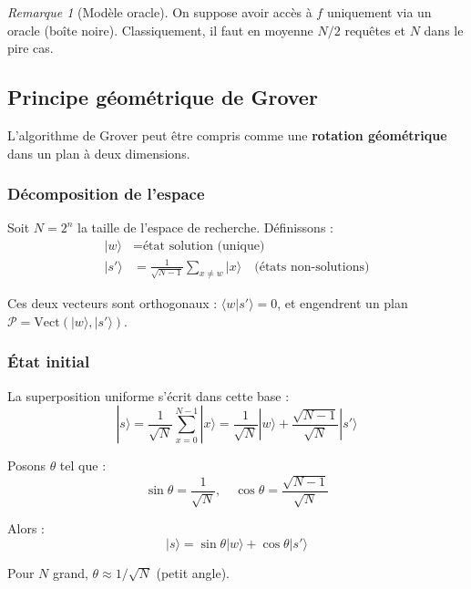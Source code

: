 \documentclass[12pt,a4paper]{article}
\theoremstyle{definition}
\theoremstyle{remark}
\newtheorem{remark}[theorem]{Remarque}
\begin{document}
\begin{remark}[Modèle oracle]
On suppose avoir accès à $f$ uniquement via un oracle (boîte noire). Classiquement, il faut en moyenne $N/2$ requêtes et $N$ dans le pire cas.
\end{remark}

\subsection{Principe géométrique de Grover}

L'algorithme de Grover peut être compris comme une \textbf{rotation géométrique} dans un plan à deux dimensions.

\subsubsection{Décomposition de l'espace}

Soit $N = 2^n$ la taille de l'espace de recherche. Définissons :
\begin{align}
|w\rangle &= \text{état solution (unique)} \\
|s'\rangle &= \frac{1}{\sqrt{N-1}} \sum_{x \neq w} |x\rangle \quad \text{(états non-solutions)}
\end{align}

Ces deux vecteurs sont orthogonaux : $\langle w | s' \rangle = 0$, et engendrent un plan $\mathcal{P} = \text{Vect}(|w\rangle, |s'\rangle)$.

\subsubsection{État initial}

La superposition uniforme s'écrit dans cette base :
\[
|s\rangle = \frac{1}{\sqrt{N}} \sum_{x=0}^{N-1} |x\rangle = \frac{1}{\sqrt{N}} |w\rangle + \frac{\sqrt{N-1}}{\sqrt{N}} |s'\rangle
\]

Posons $\theta$ tel que :
\[
\sin\theta = \frac{1}{\sqrt{N}}, \quad \cos\theta = \frac{\sqrt{N-1}}{\sqrt{N}}
\]

Alors :
\[
|s\rangle = \sin\theta |w\rangle + \cos\theta |s'\rangle
\]

Pour $N$ grand, $\theta \approx 1/\sqrt{N}$ (petit angle).
\end{document}
